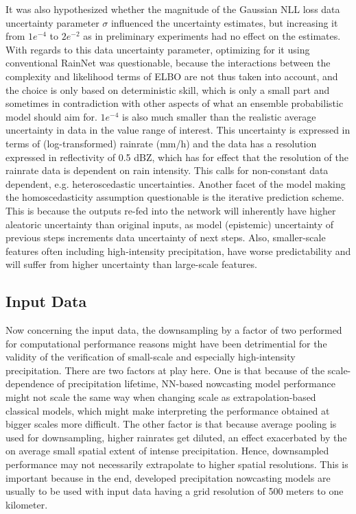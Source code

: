 It was also hypothesized whether the magnitude of the Gaussian NLL loss data uncertainty parameter $\sigma$ influenced the uncertainty estimates, but increasing it from $1e^{-4}$ to $2e^{-2}$ as in preliminary experiments had no effect on the estimates. 
With regards to this data uncertainty parameter, optimizing for it using conventional RainNet was questionable, because the interactions between the complexity and likelihood terms of ELBO are not thus taken into account, and the choice is only based on deterministic skill, which is only a small part and sometimes in contradiction with other aspects of what an ensemble probabilistic model should aim for. $1e^{-4}$ is also much smaller than the realistic average uncertainty in data in the value range of interest. This uncertainty is expressed in terms of (log-transformed) rainrate (mm/h) and the data has a resolution expressed in reflectivity of 0.5 dBZ, which has for effect that the resolution of the rainrate data is dependent on rain intensity. This calls for non-constant data dependent, e.g. heteroscedastic uncertainties. Another facet of the model making the homoscedasticity assumption questionable is the iterative prediction scheme. This is because the outputs re-fed into the network will inherently have higher aleatoric uncertainty than original inputs, as model (epistemic) uncertainty of previous steps increments data uncertainty of next steps. Also, smaller-scale features often including high-intensity precipitation, have worse predictability and will suffer from higher uncertainty than large-scale features.

\subsection*{Input Data}

Now concerning the input data, the downsampling by a factor of two performed for computational performance reasons might have been detrimential for the validity of the verification of small-scale and especially high-intensity precipitation. There are two factors at play here. One is that because of the scale-dependence of precipitation lifetime, NN-based nowcasting model performance might not scale the same way when changing scale as extrapolation-based classical models, which might make interpreting the performance obtained at bigger scales more difficult. The other factor is that because average pooling is used for downsampling, higher rainrates get diluted, an effect exacerbated by the on average small spatial extent of intense precipitation. Hence, downsampled performance may not necessarily extrapolate to higher spatial resolutions. This is important because in the end, developed precipitation nowcasting models are usually to be used with input data having a grid resolution of 500 meters to one kilometer. 

